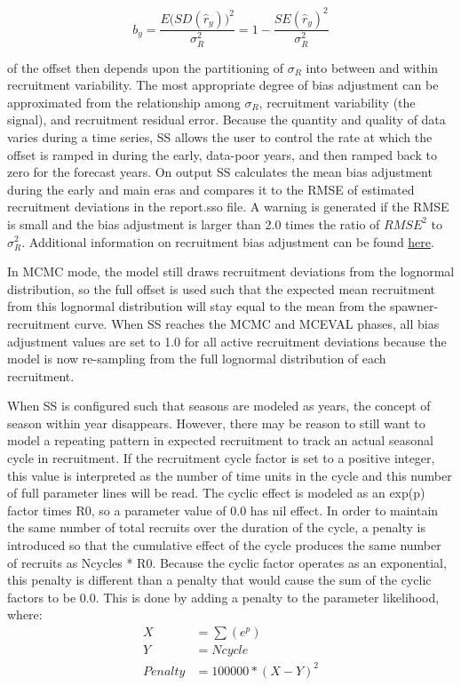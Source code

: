 \begin{equation}
	b_y=\frac{E\Big( SD(\hat{r}_y)\Big)^2}{\sigma^2_R}=1-\frac{SE(\hat{r}_y)^2}{\sigma^2_R}
\end{equation}

\noindent of the offset then depends upon the partitioning of $\sigma_R$ into between and within recruitment variability.  The most appropriate degree of bias adjustment can be approximated from the relationship among $\sigma_R$, recruitment variability (the signal), and recruitment residual error. Because the quantity and quality of data varies during a time series, SS allows the user to control the rate at which the offset is ramped in during the early, data-poor years, and then ramped back to zero for the forecast years. On output SS calculates the mean bias adjustment during the early and main eras and compares it to the RMSE of estimated recruitment deviations in the report.sso file. A warning is generated if the RMSE is small and the bias adjustment is larger than 2.0 times the ratio of $RMSE^2$ to $\sigma^2_R$. Additional information on recruitment bias adjustment can be found \hyperlink{BiasCorrect}{here}.

In MCMC mode, the model still draws recruitment deviations from the lognormal distribution, so the full offset is used such that the expected mean recruitment from this lognormal distribution will stay equal to the mean from the spawner-recruitment curve. When SS reaches the MCMC and MCEVAL phases, all bias adjustment values are set to 1.0 for all active recruitment deviations because the model is now re-sampling from the full lognormal distribution of each recruitment.

When SS is configured such that seasons are modeled as years, the concept of season within year disappears.  However, there may be reason to still want to model a repeating pattern in expected recruitment to track an actual seasonal cycle in recruitment.  If the recruitment cycle factor is set to a positive integer, this value is interpreted as the number of time units in the cycle and this number of full parameter lines will be read. The cyclic effect is modeled as an exp(p) factor times R0, so a parameter value of 0.0 has nil effect. In order to maintain the same number of total recruits over the duration of the cycle, a penalty is introduced so that the cumulative effect of the cycle produces the same number of recruits as Ncycles * R0. Because the cyclic factor operates as an exponential, this penalty is different than a penalty that would cause the sum of the cyclic factors to be 0.0.  This is done by adding a penalty to the parameter likelihood, where:
\begin{equation}
	\begin{split}
				   X & = \sum(e^p)  \\
				   Y & = Ncycle  \\
				   Penalty & = 100000*(X-Y)^2
	\end{split}
\end{equation}

